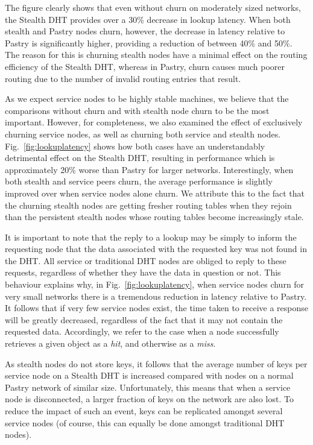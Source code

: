 \documentclass[letterpaper]{sig-alternate} %
\begin{document}
The figure clearly shows that even without churn on moderately sized networks,
the Stealth DHT provides over a 30\% decrease in lookup latency. When both
stealth and Pastry nodes churn, however, the decrease in latency relative to
Pastry is significantly higher, providing a reduction of between 40\% and 50\%.
The reason for this is churning stealth nodes have a minimal effect on the
routing efficiency of the Stealth DHT, whereas in Pastry, churn causes much
poorer routing due to the number of invalid routing entries that result.

As we expect service nodes to be highly stable machines, we believe
that the comparisons without churn and with stealth node churn to be
the most important. However, for completeness, we also examined the
effect of exclusively churning service nodes, as well as churning both
service and stealth nodes. Fig.~\ref{fig:lookuplatency} shows how both
cases have an understandably detrimental effect on the Stealth DHT,
resulting in performance which is approximately 20\% worse than Pastry
for larger networks. Interestingly, when both stealth and service peers
churn, the average performance is slightly improved over when service
nodes alone churn. We attribute this to the fact that the churning
stealth nodes are getting fresher routing tables when they rejoin than
the persistent stealth nodes whose routing tables become increasingly
stale.

It is important to note that the reply to a lookup may be simply to
inform the requesting node that the data associated with the
requested key was not found in the DHT. All service or traditional
DHT nodes are obliged to reply to these requests, regardless of
whether they have the data in question or not. This behaviour
explains why, in Fig.~\ref{fig:lookuplatency}, when service nodes
churn for very small networks there is a tremendous reduction in
latency relative to Pastry. It follows that if very few service
nodes exist, the time taken to receive a response will be greatly
decreased, regardless of the fact that it may not contain the
requested data. Accordingly, we refer to the case when a node
successfully retrieves a given object as a \emph{hit}, and otherwise
as a \emph{miss}.

As stealth nodes do not store keys, it follows that the average
number of keys per service node on a Stealth DHT is increased
compared with nodes on a normal Pastry network of similar size.
Unfortunately, this means that when a service node is disconnected,
a larger fraction of keys on the network are also lost. To reduce
the impact of such an event, keys can be replicated amongst several
service nodes (of course, this can equally be done amongst
traditional DHT nodes).
\end{document}
